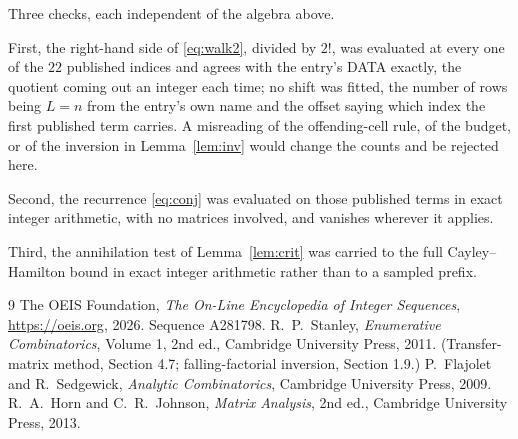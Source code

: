 \documentclass[11pt,a4paper]{article}
\theoremstyle{plain}
\theoremstyle{definition}
\begin{document}
Three checks, each independent of the algebra above.

First, the right-hand side of \eqref{eq:walk2}, divided by $2!$, was evaluated at every
one of the $22$ published indices and agrees with the entry's DATA exactly, the quotient
coming out an integer each time; no shift was fitted, the number of rows being
$L=n$ from the entry's own name and the offset saying which index the first published
term carries. A misreading of the offending-cell rule, of the budget, or of the inversion in
Lemma~\ref{lem:inv} would change the counts and be rejected here.

Second, the recurrence \eqref{eq:conj} was evaluated on those published terms in exact
integer arithmetic, with no matrices involved, and vanishes wherever it applies.

Third, the annihilation test of Lemma~\ref{lem:crit} was carried to the full
Cayley--Hamilton bound in exact integer arithmetic rather than to a sampled prefix.

\begin{thebibliography}{9}
 The OEIS Foundation, \emph{The On-Line Encyclopedia of Integer
Sequences}, \url{https://oeis.org}, 2026. Sequence A281798.
 R.~P.~Stanley, \emph{Enumerative Combinatorics}, Volume 1, 2nd ed.,
Cambridge University Press, 2011. (Transfer-matrix method, Section 4.7; falling-factorial
inversion, Section 1.9.)
 P.~Flajolet and R.~Sedgewick, \emph{Analytic Combinatorics}, Cambridge
University Press, 2009.
 R.~A.~Horn and C.~R.~Johnson, \emph{Matrix Analysis}, 2nd ed., Cambridge
University Press, 2013.
\end{thebibliography}
\end{document}
